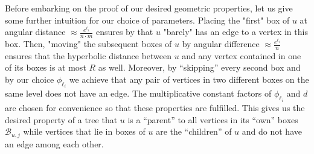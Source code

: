 \documentclass[letterpaper,11pt]{article}
\newcommand{\1}{\mathbb I}
\newcommand{\boxbelow}[2]{\mathcal{B}_{#1, #2}}
\begin{document}
Before embarking on the proof of our desired geometric properties, let us give some further intuition for our choice of parameters. Placing the "first" box of $u$ at angular distance $\approx \frac{e^{\ell_i}}{n\cdot m}$ ensures by  that $u$ "barely" has an edge to a vertex in this box. Then, "moving" the subsequent boxes of $u$ by angular difference $\approx \frac{e^{\ell_i}}{n}$ ensures that the hyperbolic distance between $u$ and any vertex contained in one of its boxes is at most $R$ as well. Moreover, by ``skipping'' every second box and by our choice $\phi_{\ell_i}$ we achieve that any pair of vertices in two different boxes on the same level does not have an edge. The multiplicative constant factors of $\phi_{\ell_i}$ and $d$ are chosen for convenience so that these properties are fulfilled. This gives us the desired property of a tree that $u$ is a ``parent'' to all vertices in its ``own'' boxes $\boxbelow{u}{j}$ while vertices that lie in boxes of $u$ are the ``children'' of $u$ and do not have an edge among each other.
\end{document}
